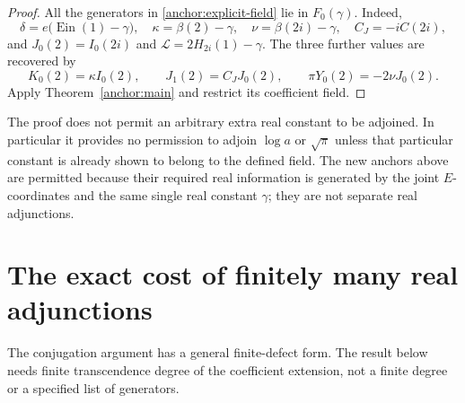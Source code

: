 \documentclass[11pt]{article}
\theoremstyle{definition}
\theoremstyle{remark}
\newcommand{\Ein}{\operatorname{Ein}}
\begin{document}
\begin{proof}
All the generators in \eqref{anchor:explicit-field} lie in
$F_0(\gamma)$. Indeed,
\[
 \delta=e\bigl(\Ein(1)-\gamma\bigr),\quad
 \kappa=\beta(2)-\gamma,\quad
 \nu=\beta(2i)-\gamma,\quad C_J=-iC(2i),
\]
and $J_0(2)=I_0(2i)$ and $\mathcal L=2H_{2i}(1)-\gamma$.
The three further values are recovered by
\[
 K_0(2)=\kappa I_0(2),\qquad
 J_1(2)=C_JJ_0(2),\qquad
 \pi Y_0(2)=-2\nu J_0(2).
\]
Apply Theorem~\ref{anchor:main} and restrict its coefficient field.
\end{proof}

The proof does not permit an arbitrary extra real constant to be
adjoined. In particular it provides no permission to adjoin
$\log a$ or $\sqrt\pi$ unless that particular constant is already
shown to belong to the defined field. The new anchors above are
permitted because their required real information is generated by
the joint $E$-coordinates and the same single real constant
$\gamma$; they are not separate real adjunctions.

\section{The exact cost of finitely many real adjunctions}
\label{rdef:section}

The conjugation argument has a general finite-defect form. The result
below needs finite transcendence degree of the coefficient extension,
not a finite degree or a specified list of generators.
\end{document}
